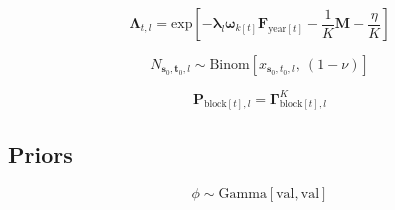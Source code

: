\documentclass{article}
\begin{document}

\begin{equation}
  \label{eq:model-survival}
    \boldsymbol{\Lambda}_{t,l} = 
      \mathrm{exp} \! \left[ -
      \boldsymbol{\lambda}_{l} \boldsymbol{\omega}_{k[t]}  
      \boldsymbol{F}_{\mathrm{year}[t]} - \frac{1}{K} \boldsymbol{M} - \frac{\eta}{K} \right]
\end{equation}


\begin{equation}
  \label{eq:model-release}
  N_{\boldsymbol{s}_{0},\boldsymbol{t}_{0},l} \sim 
    \mathrm{Binom} \! \left[ x_{\boldsymbol{s}_{0},t_{0},l} \mathrm{,} \: \left( 1 - \nu \right) \right]
\end{equation}

\begin{equation}
  \label{eq:model-movement}
  \boldsymbol{P}_{\mathrm{block}[t],l} = \boldsymbol{\Gamma}^{K}_{\mathrm{block}[t],l}
\end{equation}



\subsection{Priors}

\begin{equation}
  \label{eq:prior-dispersion}
  \phi \sim \mathrm{Gamma} \! \left[ \mathrm{val, val} \right]
\end{equation}
\end{document}

